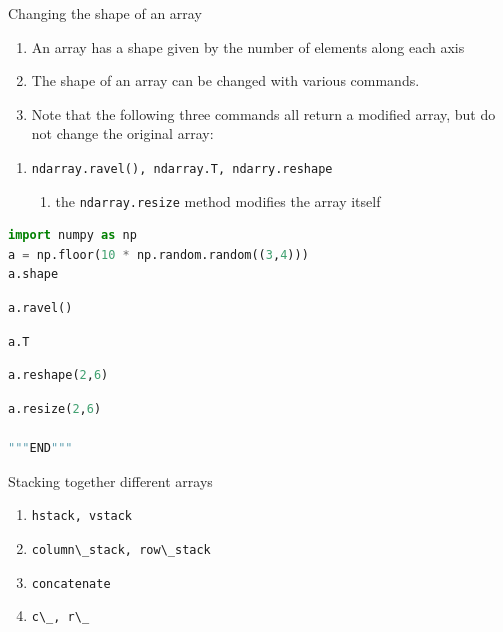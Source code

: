 \documentclass[ignorenonframetext,11pt,xcolor=dvipsnames,hyperref={colorlinks,allcolors=.,urlcolor=blue, citecolor=violet, bookmarksdepth=4},aspectratio=1610]{beamer}
\providecommand{\tightlist}{%
  \setlength{\itemsep}{0pt}\setlength{\parskip}{0pt}}
\newcommand{\passthrough}[1]{#1}
\begin{document}
\begin{frame}[fragile]{Changing the shape of an array}
\protect\hypertarget{changing-the-shape-of-an-array}{}

\begin{enumerate}
\tightlist
\item
  An array has a shape given by the number of elements along each axis
\item
  The shape of an array can be changed with various commands.
\item
  Note that the following three commands all return a modified array,
  but do not change the original array:
\end{enumerate}

\begin{enumerate}
\tightlist
\item
  \passthrough{\lstinline!ndarray.ravel(), ndarray.T, ndarry.reshape!}

  \begin{enumerate}
  \tightlist
  \item
    the \passthrough{\lstinline!ndarray.resize!} method modifies the
    array itself
  \end{enumerate}
\end{enumerate}

\begin{lstlisting}[language=Python]
import numpy as np
a = np.floor(10 * np.random.random((3,4)))
a.shape
\end{lstlisting}

\begin{lstlisting}[language=Python]
a.ravel()
\end{lstlisting}

\begin{lstlisting}[language=Python]
a.T
\end{lstlisting}

\begin{lstlisting}[language=Python]
a.reshape(2,6)
\end{lstlisting}

\begin{lstlisting}[language=Python]
a.resize(2,6)

"""END"""
\end{lstlisting}

\end{frame}

\begin{frame}[fragile]{Stacking together different arrays}
\protect\hypertarget{stacking-together-different-arrays}{}

\begin{enumerate}
\tightlist
\item
  \passthrough{\lstinline!hstack, vstack!}
\item
  \passthrough{\lstinline!column\_stack, row\_stack!}
\item
  \passthrough{\lstinline!concatenate!}
\item
  \passthrough{\lstinline!c\_, r\_!}
\end{enumerate}

\end{frame}
\end{document}
